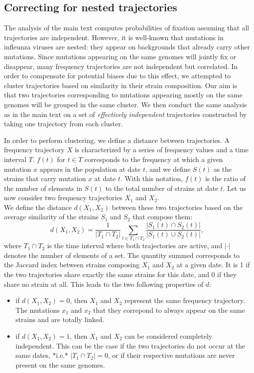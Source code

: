 \documentclass[reprint,amsmath,amssymb,superscriptaddress,showpacs,rmp]{revtex4-1}
\begin{document}
\subsection{Correcting for nested trajectories} %
\label{sub:correcting_for_nested_trajectories}

The analysis of the main text computes probabilities of fixation assuming that all trajectories are independent.
However, it is well-known that mutations in infleunza viruses are nested: they appear on backgrounds that already carry other mutations.
Since mutations appearing on the same genomes will jointly fix or disappear, many frequency trajectories are not independent but correlated.
In order to compensate for potential biases due to this effect, we attempted to cluster trajectories based on similarity in their strain composition.
Our aim is that two trajectories corresponding to mutations appearing mostly on the same genomes will be grouped in the same cluster.
We then conduct the same analysis as in the main text on a set of \emph{effectively independent} trajectories constructed by taking one trajectory from each cluster.

In order to perform clustering, we define a distance between trajectories.
A frequency trajectory $X$ is characterized by a series of frequency values and a time interval $T$.
$f(t)$ for $t\in T$ corresponds to the frequency at which a given mutation $x$ appears in the population at date $t$, and we define $S(t)$ as the strains that carry mutation $x$ at date $t$.
With this notation, $f(t)$ is the ratio of the number of elements in $S(t)$ to the total number of strains at date $t$.
Let us now consider two frequency trajectories $X_1$ and $X_2$. \\
We define the distance $d(X_1,X_2)$ between these two trajectories based on the average similarity of the strains $S_1$ and $S_2$ that compose them:
$$ d(X_1,X_2) = \frac{1}{\vert T_1\cap T_2\vert}\sum_{t\in T_1\cap T_2} \frac{\vert S_1(t)\cap S_2(t)\vert}{\vert S_1(t)\cup S_2(t)\vert}, $$
where $T_1\cap T_2$ is the time interval where both trajectories are active, and $\vert\cdot\vert$ denotes the number of elements of a set.
The quantity summed corresponds to the Jaccard index between strains composing $X_1$ and $X_2$ at a given date.
It is 1 if the two trajectories share exactly the same strains for this date, and 0 if they share no strain at all.
This leads to the two following properties of $d$:
\begin{itemize}
	\item if $d(X_1,X_2)=0$, then $X_1$ and $X_2$ represent the same frequency trajectory. The mutations $x_1$ and $x_2$ that they correpond to always appear on the same strains and are totally linked.
	\item if $d(X_1,X_2)=1$, then $X_1$ and $X_2$ can be considered completely independent. This can be the case if the two trajectories do not occur at the same dates, *i.e.* $\vert T_1\cap T_2\vert=0$, or if their respective mutations are never present on the same genomes.
\end{itemize}
\end{document}
